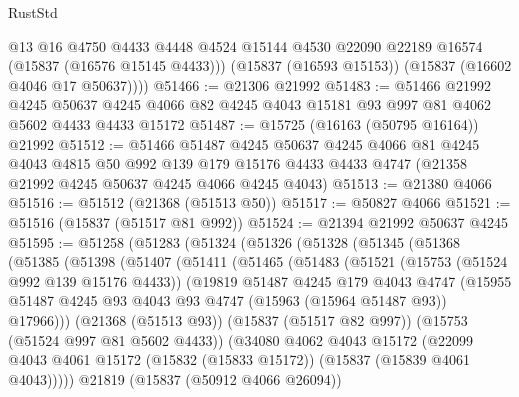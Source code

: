 \begin{lexlean}{RustStd}
\begin{coremodule}
{\begin{coremodule}
{{{{{{{{{{{{{{{{{{{{{{{{{{{{{{{{{{{{{{{{{{{{{{{{{{{{{{{{{{{{          @13
          @16
          @4750
          @4433
          @4448
          @4524
          @15144
          @4530
          @22090
          @22189
          @16574
          (@15837 (@16576 @15145 @4433)))
        (@15837 (@16593 @15153))
        (@15837 (@16602 @4046 @17 @50637))))
@51466 := @21306 @21992
@51483 := @51466
    @21992
    @4245
    @50637
    @4245
    @4066
    @82
    @4245
    @4043
    @15181
    @93
    @997
    @81
    @4062
    @5602
    @4433
    @4433
    @15172
@51487 := @15725 (@16163 (@50795 @16164)) @21992
@51512 := @51466
    @51487
    @4245
    @50637
    @4245
    @4066
    @81
    @4245
    @4043
    @4815
    @50
    @992
    @139
    @179
    @15176
    @4433
    @4433
    @4747
    (@21358 @21992 @4245 @50637 @4245 @4066 @4245 @4043)
@51513 := @21380 @4066
@51516 := @51512 (@21368 (@51513 @50))
@51517 := @50827 @4066
@51521 := @51516 (@15837 (@51517 @81 @992))
@51524 := @21394 @21992 @50637 @4245
@51595 := @51258
    (@51283
      (@51324
        (@51326
          (@51328
            (@51345
              (@51368
                (@51385
                  (@51398
                    (@51407
                      (@51411
                        (@51465
                          (@51483
                            (@51521
                              (@15753 (@51524 @992 @139 @15176 @4433))
                              (@19819
                                @51487
                                @4245
                                @179
                                @4043
                                @4747
                                (@15955
                                  @51487
                                  @4245
                                  @93
                                  @4043
                                  @93
                                  @4747
                                  (@15963 (@15964 @51487 @93))
                                  @17966)))
                            (@21368 (@51513 @93))
                            (@15837 (@51517 @82 @997))
                            (@15753 (@51524 @997 @81 @5602 @4433))
                            (@34080
                              @4062
                              @4043
                              @15172
                              (@22099
                                @4043
                                @4061
                                @15172
                                (@15832 (@15833 @15172))
                                (@15837 (@15839 @4061 @4043)))))
                          @21819
                          (@15837 (@50912 @4066 @26094))
}}}}}}}}}}}}}}}}}}}}}}}}}}}}}}}}}}}}}}}}}}}}}}}}}}}}}}}}}}}}
\end{coremodule}}
\end{coremodule}
\end{lexlean}
